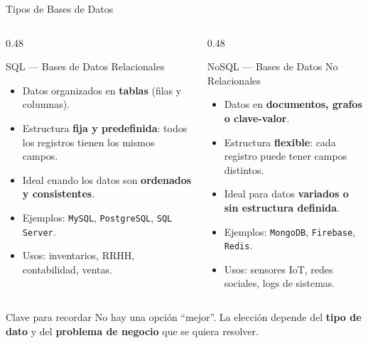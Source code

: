 \documentclass[aspectratio=169]{beamer}
\newcommand{\tech}[1]{\texttt{\textcolor{mainColor}{#1}}}
\begin{document}
\begin{frame}{Tipos de Bases de Datos}
  \small
  \begin{columns}[T]
    \begin{column}{0.48\textwidth}
      \begin{block}{\faTable\enspace SQL --- Bases de Datos Relacionales}
        \small
        \begin{itemize}\setlength\itemsep{4pt}
          \item Datos organizados en \textbf{tablas} (filas y columnas).
          \item Estructura \textbf{fija y predefinida}: todos los registros tienen los mismos campos.
          \item Ideal cuando los datos son \textbf{ordenados y consistentes}.
          \item Ejemplos: \tech{MySQL}, \tech{PostgreSQL}, \tech{SQL Server}.
          \item Usos: inventarios, RRHH, contabilidad, ventas.
        \end{itemize}
      \end{block}
    \end{column}
    \begin{column}{0.48\textwidth}
      \begin{block}{\faCode\enspace NoSQL --- Bases de Datos No Relacionales}
        \small
        \begin{itemize}\setlength\itemsep{4pt}
          \item Datos en \textbf{documentos, grafos o clave-valor}.
          \item Estructura \textbf{flexible}: cada registro puede tener campos distintos.
          \item Ideal para datos \textbf{variados o sin estructura definida}.
          \item Ejemplos: \tech{MongoDB}, \tech{Firebase}, \tech{Redis}.
          \item Usos: sensores IoT, redes sociales, logs de sistemas.
        \end{itemize}
      \end{block}
    \end{column}
  \end{columns}
  \vspace{0.2cm}
  \begin{alertblock}{\faLightbulb\enspace Clave para recordar}
    \centering\small
    No hay una opción ``mejor''. La elección depende del \textbf{tipo de dato} y del \textbf{problema de negocio} que se quiera resolver.
  \end{alertblock}
\end{frame}
\end{document}
